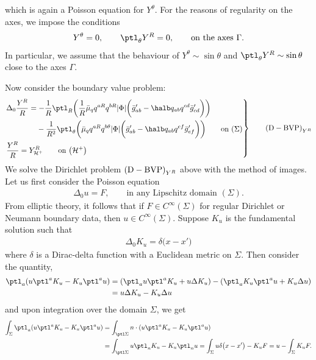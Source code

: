 which is again a Poisson equation for $Y^\theta$. For the reasons of regularity on the axes, we impose the conditions \cite{O_Rinne_J_Stewart_2005}{\samepage
\begin{align*}
Y^ \theta =0, \qquad \ptl_\theta Y^R =0, \qquad \text{on the axes} \ \Gamma.
\end{align*}
In particular, we assume that the behaviour of $Y^\theta \sim \sin \theta$ and $\ptl_\theta Y^R \sim \sin \theta$ close to the axes $\Gamma$.}

Now consider the boundary value problem:
\begin{equation*}
\left.\begin{aligned}
&\Delta_0 \frac{Y^R}{R} =- \frac{1}{R} \ptl_R \biggl(\frac{1}{R} \bar{\mu}_q q^{aR} q^{bR} \vert \Phi \vert \biggl(\bar{g}'_{ab} - \halb q_{ab} q^{cd} \bar{g}'_{cd}\biggr)\biggr) \notag \\
&\hphantom{\Delta_0 \frac{Y^R}{R} =}{} -\frac{1}{R^2} \ptl_ \theta \biggl(\bar{\mu}_q q^{aR} q^{b\theta} \vert \Phi \vert \biggl(\bar{g}'_{ab} - \halb q_{ab} q^{ef} \bar{g}'_{ef}\biggr)\biggr) \qquad \text{on} \ (\Sigma)\\
&\frac{Y^R}{R}= Y^R_{\mathcal{H}^+} \qquad \text{on} \ \bigl(\mathcal{H}^+\bigr)
\end{aligned}
 \right\}
\qquad {\rm (D-BVP)}_{Y^R}
\end{equation*}
We solve the Dirichlet problem ${\rm (D-BVP)}_{Y^R}$ above with the method of images. Let us first consider the Poisson equation
\begin{align*}
\Delta_0 u= F, \qquad \text{in any Lipschitz domain $(\Sigma)$}.
\end{align*}
From elliptic theory, it follows that if $F \in C^{\infty} (\Sigma)$ for regular Dirichlet or Neumann boundary data, then $u \in C^{\infty} (\Sigma)$.
Suppose $K_u$ is the fundamental solution such that
\begin{align*}
\Delta_0 K_u = \delta \bigl(x-x'\bigr)
\end{align*}
where $\delta$ is a Dirac-delta function with a Euclidean metric on $\Sigma$.
Then consider the quantity,
\begin{align*}
\ptl_a (u \ptl^a K_u - K_u \ptl^a u) &{}= (\ptl_a u \ptl^a K_u+ u \Delta K_u) - (\ptl_a K_u \ptl^a u + K_u \Delta u) \notag\\
&{}= u \Delta K_u - K_u \Delta u
\end{align*}
and upon integration over the domain $\Sigma$, we get
\begin{align*}
\int_{\Sigma} \ptl_a (u \ptl^a K_{u} - K_{u} \ptl^a u) &{}= \int_{\ptl \Sigma} n \cdot (u\ptl^a K_{u} - K_{u} \ptl^a u) \notag \\
&{}= \int_{\ptl \Sigma} u \ptl_n K_u - K_u \ptl_n u
= \int_{\Sigma} u\delta \bigl(x-x'\bigr) - K_u F = u - \int_{\Sigma} K_u F.
\end{align*}
